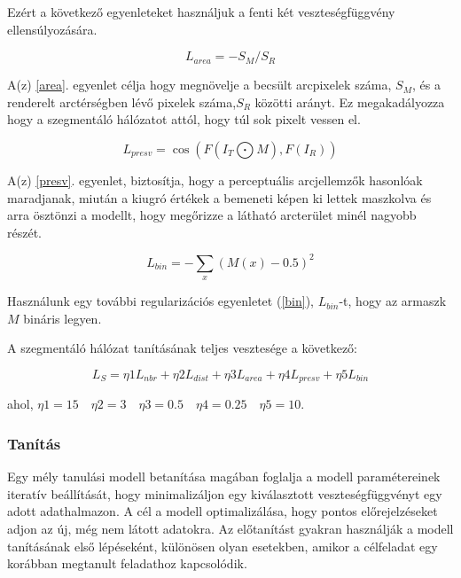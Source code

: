 \documentclass[12pt,a4]{article}
\begin{document}
            Ezért a következő egyenleteket használjuk a fenti két veszteségfüggvény ellensúlyozására.
                
            \begin{equation} \label{area}
                L_{area} = -S_{M}/S_{R}
            \end{equation}

            A(z) \ref{area}. egyenlet célja hogy megnövelje a becsült arcpixelek száma, $S_{M}$, és a renderelt arctérségben lévő pixelek száma,$S_{R}$ közötti arányt. Ez megakadályozza hogy a szegmentáló hálózatot attól, hogy túl sok pixelt vessen el.
                
            \begin{equation} \label{presv}
                L_{presv} = \cos(F(I_{T} \bigodot M),F(I_{R}))
            \end{equation}

            A(z) \ref{presv}. egyenlet, biztosítja, hogy a perceptuális
            arcjellemzők hasonlóak maradjanak, miután a kiugró értékek a bemeneti képen ki lettek maszkolva és arra ösztönzi a modellt, hogy megőrizze a látható arcterület minél nagyobb részét.

            \begin{equation} \label{bin}
                L_{bin} = -\sum\limits_{x}(M(x) - 0.5)^2
            \end{equation}

            Használunk egy további regularizációs egyenletet (\ref{bin}), $L_{bin}$-t, hogy az armaszk $M$ bináris legyen.

            A szegmentáló hálózat tanításának teljes vesztesége a következő:

            \begin{equation}
                L_{S} = \eta{1}L_{nbr} + \eta{2}L_{dist} + \eta{3}L_{area} + \eta{4}L_{presv} + \eta{5}L_{bin}
            \end{equation}

            ahol, $\eta{1} = 15 \quad \eta{2} = 3 \quad \eta{3} = 0.5 \quad \eta{4} = 0.25 \quad \eta{5} = 10$.
            
    \subsubsection{Tanítás}
        Egy mély tanulási modell betanítása magában foglalja a modell paramétereinek iteratív beállítását, hogy minimalizáljon egy kiválasztott veszteségfüggvényt egy adott adathalmazon. A cél a modell optimalizálása, hogy pontos előrejelzéseket adjon az új, még nem látott adatokra. Az előtanítást gyakran használják a modell tanításának első lépéseként, különösen olyan esetekben, amikor a célfeladat egy korábban megtanult feladathoz kapcsolódik.
\end{document}
